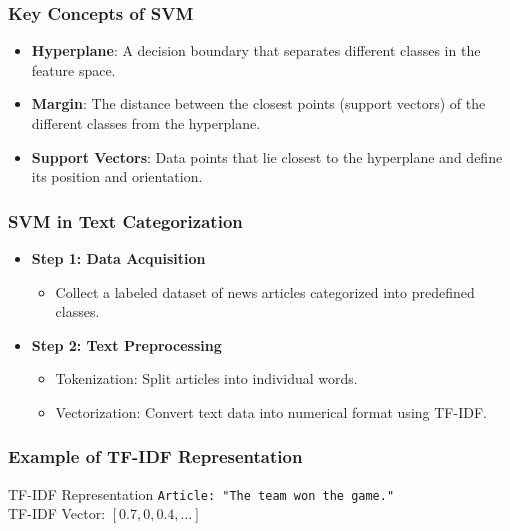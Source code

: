 \documentclass{beamer}
\begin{document}
\begin{frame}[fragile]
    \frametitle{Key Concepts of SVM}
    \begin{itemize}
        \item \textbf{Hyperplane}: A decision boundary that separates different classes in the feature space.
        \item \textbf{Margin}: The distance between the closest points (support vectors) of the different classes from the hyperplane.
        \item \textbf{Support Vectors}: Data points that lie closest to the hyperplane and define its position and orientation.
    \end{itemize}
\end{frame}

\begin{frame}[fragile]
    \frametitle{SVM in Text Categorization}
    \begin{itemize}
        \item \textbf{Step 1: Data Acquisition} 
            \begin{itemize}
                \item Collect a labeled dataset of news articles categorized into predefined classes.
            \end{itemize}
        \item \textbf{Step 2: Text Preprocessing}
            \begin{itemize}
                \item Tokenization: Split articles into individual words.
                \item Vectorization: Convert text data into numerical format using TF-IDF.
            \end{itemize}
    \end{itemize}
\end{frame}

\begin{frame}[fragile]
    \frametitle{Example of TF-IDF Representation}
    \begin{block}{TF-IDF Representation}
        \texttt{Article: "The team won the game."} \\
        TF-IDF Vector: \([0.7, 0, 0.4, \ldots]\)
    \end{block}
\end{frame}
\end{document}

